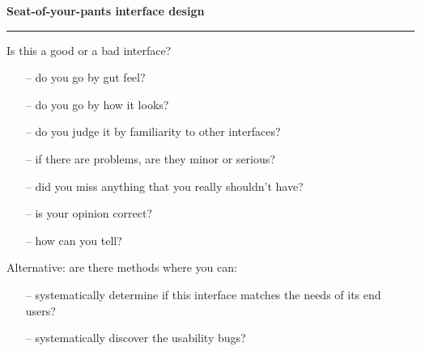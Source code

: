 \documentclass[pdf]{beamer}
\begin{document}
\begin{frame}
\vspace{8mm}
\textcolor{myBlue}{\textbf{\Large{Seat-of-your-pants interface design}}}

\textcolor{red}{\rule{10cm}{1mm}}	
	
    Is this a good or a bad interface? 
    \begin{itemize}
      \item [--]do you go by gut feel?
      \item [--]do you go by how it looks?
      \item [--]do you judge it by familiarity to other interfaces?
      \item [--]if there are problems, are they minor or serious?
      \item [--]did you miss anything that you really shouldn’t have?
      \item [--]is your opinion correct? 
      \item [--]how can you tell? \newline
    \end{itemize}
    
    Alternative: are there methods where you can:
    \begin{itemize}
      \item [--]systematically determine if this interface matches the needs of its end users?
      \item [--]systematically discover the usability bugs?   
    \end{itemize}
\end{frame}
\end{document}
